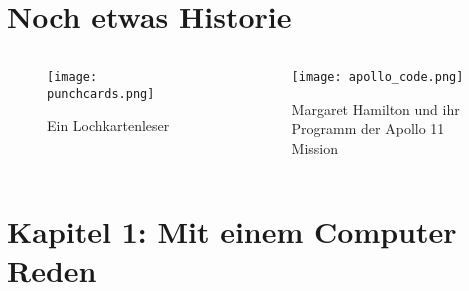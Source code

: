 \maketitle

\section{Noch etwas Historie}
\begin{frame}
	\slidehead
	\vspace{3mm}
	\begin{columns}[b]
		\begin{column}{.3\textwidth}
			\begin{figure}
				\centering
				\texttt{[image: punchcards.png]}
				\caption*{Ein Lochkartenleser}
			\end{figure}
		\end{column}%
		\begin{column}{.4\textwidth}
			\centering
			\begin{figure}
				\centering
				\texttt{[image: apollo\_code.png]}
				\caption*{\footnotesize Margaret Hamilton und ihr \\ Programm der Apollo 11 Mission}
			\end{figure}
		\end{column}
	\end{columns}
\end{frame}

\section{Kapitel 1: Mit einem Computer Reden}
